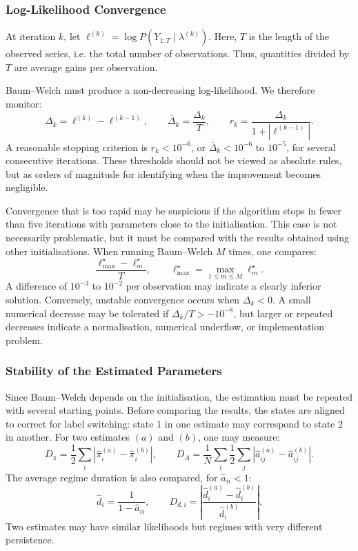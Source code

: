 \documentclass[11pt]{article}
\begin{document}
\subsubsection{Log-Likelihood Convergence}

At iteration \(k\), let \(\ell^{(k)}=\log P(Y_{1:T}\mid \lambda^{(k)})\). Here, \(T\) is the length of the observed series, i.e. the total number of observations. Thus, quantities divided by \(T\) are average gains per observation.

Baum--Welch must produce a non-decreasing log-likelihood. We therefore monitor:
\[
\Delta_k=\ell^{(k)}-\ell^{(k-1)},\qquad
\overline{\Delta}_k=\frac{\Delta_k}{T},\qquad
r_k=\frac{\Delta_k}{1+|\ell^{(k-1)}|}.
\]
A reasonable stopping criterion is \(r_k<10^{-6}\), or \(\overline{\Delta}_k<10^{-6}\) to \(10^{-5}\), for several consecutive iterations. These thresholds should not be viewed as absolute rules, but as orders of magnitude for identifying when the improvement becomes negligible.

Convergence that is too rapid may be suspicious if the algorithm stops in fewer than five iterations with parameters close to the initialisation. This case is not necessarily problematic, but it must be compared with the results obtained using other initialisations. When running Baum--Welch \(M\) times, one compares:
\[
\frac{\ell_{\max}^\star-\ell_m^\star}{T},
\qquad
\ell_{\max}^\star=\max_{1\leq m\leq M}\ell_m^\star.
\]
A difference of \(10^{-3}\) to \(10^{-2}\) per observation may indicate a clearly inferior solution. Conversely, unstable convergence occurs when \(\Delta_k<0\). A small numerical decrease may be tolerated if \(\Delta_k/T>-10^{-8}\), but larger or repeated decreases indicate a normalisation, numerical underflow, or implementation problem.

\subsubsection{Stability of the Estimated Parameters}

Since Baum--Welch depends on the initialisation, the estimation must be repeated with several starting points. Before comparing the results, the states are aligned to correct for label switching: state \(1\) in one estimate may correspond to state \(2\) in another. For two estimates \((a)\) and \((b)\), one may measure:
\[
D_{\pi}=\frac12\sum_i
\left|\widehat{\pi}^{(a)}_i-\widehat{\pi}^{(b)}_i\right|,
\qquad
D_A=
\frac1N\sum_i\frac12\sum_j
\left|\widehat{a}^{(a)}_{ij}-\widehat{a}^{(b)}_{ij}\right|.
\]
The average regime duration is also compared, for $\widehat{a}_{ii} < 1$:
\[
\widehat{d}_i=\frac{1}{1-\widehat{a}_{ii}},
\qquad
D_{d,i}
=
\left|
\frac{\widehat{d}^{(a)}_i-\widehat{d}^{(b)}_i}
{\widehat{d}^{(b)}_i}
\right|.
\]
Two estimates may have similar likelihoods but regimes with very different persistence.
\end{document}
